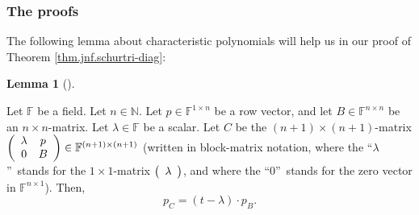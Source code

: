 \documentclass[numbers=enddot,12pt,final,onecolumn,notitlepage]{scrartcl}%
\numberwithin{exer}{subsection}
\theoremstyle{definition}
\newtheorem{lem}[theo]{Lemma}
\newenvironment{lemma}[1][]
{\begin{lem}[#1]\begin{leftbar}}
{\end{leftbar}\end{lem}}
\begin{document}
\subsubsection{The proofs}

The following lemma about characteristic polynomials will help us in our proof
of Theorem \ref{thm.jnf.schurtri-diag}:

\begin{lemma}
\label{lem.jnf.schurtri-diag.descend-poly}Let $\mathbb{F}$ be a field. Let
$n\in\mathbb{N}$. Let $p\in\mathbb{F}^{1\times n}$ be a row vector, and let
$B\in\mathbb{F}^{n\times n}$ be an $n\times n$-matrix. Let $\lambda
\in\mathbb{F}$ be a scalar. Let $C$ be the $\left(  n+1\right)  \times\left(
n+1\right)  $-matrix $\left(
\begin{array}
[c]{cc}%
\lambda & p\\
0 & B
\end{array}
\right)  \in\mathbb{F}^{\left(  n+1\right)  \times\left(  n+1\right)  }$
(written in block-matrix notation, where the \textquotedblleft$\lambda
$\textquotedblright\ stands for the $1\times1$-matrix $\left(
\begin{array}
[c]{c}%
\lambda
\end{array}
\right)  $, and where the \textquotedblleft$0$\textquotedblright\ stands for
the zero vector in $\mathbb{F}^{n\times1}$). Then,
\[
p_{C}=\left(  t-\lambda\right)  \cdot p_{B}.
\]

\end{lemma}
\end{document}
